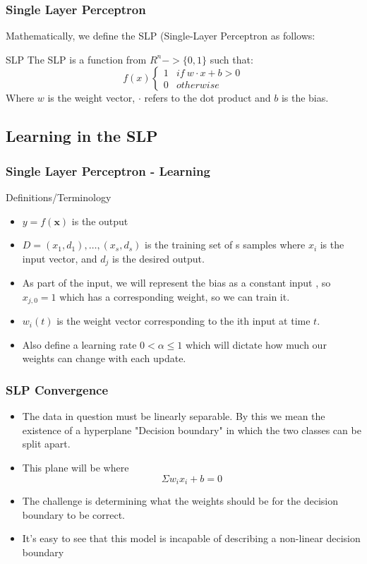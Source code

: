 \documentclass{beamer}
\begin{document}
\begin{frame}
\frametitle{Single Layer Perceptron}
Mathematically, we define the SLP (Single-Layer Perceptron as follows:

\begin{block}{SLP}
The SLP is a function from $R^n->\{0,1\}$ such that:
$$
   f(x) \left\{
     \begin{array}{ll}
       1 &   if \:  w\cdot x+b >0\\
       0 &  otherwise
     \end{array}
   \right.
$$
Where  $w$ is the weight vector, $\cdot$ refers to the dot product and $b$ is the bias.
\end{block}
\end{frame}

\subsection{Learning in the SLP}
\begin{frame}
\frametitle{Single Layer Perceptron - Learning}
\begin{block}{Definitions/Terminology}
\begin{itemize}
\item $y=f(\textbf{x})$ is the output 
\item $D={(x_1, d_1),\dots,(x_s,d_s)}$ is the training set of s samples where $x_i$ is the input vector, and $d_j$ is the desired output. 
\item As part of the input, we will represent the bias as a constant input , so $x_{j,0}=1$ which has a corresponding weight, so we can train it.
\item $w_i(t)$ is the weight vector corresponding to the ith input at time $t$. 
\item Also define a learning rate $0<\alpha\leq 1$ which will dictate how much our weights can change with each update.
\end{itemize}
\end{block}
\end{frame}

\begin{frame}
\frametitle{SLP Convergence}
\begin{itemize}
\item The  data in question must be linearly separable. By this we mean the existence of a hyperplane "Decision boundary" in which the two classes can be split apart.
\item This plane will be where $$\Sigma w_ix_i + b = 0 $$
\item The challenge is determining what the weights should be for the decision boundary to be correct.
\item It's easy to see that this model is incapable of describing a non-linear decision boundary
\end{itemize}
\end{frame}
\end{document}
